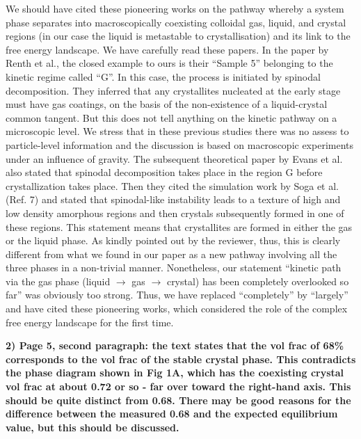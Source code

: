 \documentclass[11pt,a4paper]{article}
\newenvironment{referee}%
{\bigskip\singlespacing\bf}%
{\par\bigskip}
\begin{document}
We should have cited these pioneering works on the pathway whereby a system phase separates into macroscopically coexisting colloidal gas, liquid, and crystal regions (in our case the liquid is metastable to crystallisation) and its link to the free energy landscape. We have carefully read these papers. In the paper by Renth et al., the closed example to ours is their ``Sample 5'' belonging to the kinetic regime called ``G''. In this case, the process is initiated by spinodal decomposition. They inferred that any crystallites nucleated at the early stage must have gas coatings, on the basis of the non-existence of a liquid-crystal common tangent. But this does not tell anything on the kinetic pathway on a microscopic level. We stress that in these previous studies there was no assess to particle-level information and the discussion is based on macroscopic experiments under an influence of gravity. The subsequent theoretical paper by Evans et al. also stated that spinodal decomposition takes 
place in the region G before crystallization takes place. Then they cited the 
simulation work by Soga et al. (Ref. 7) and stated that spinodal-like instability leads to a texture of high and low density amorphous regions and then crystals subsequently formed in one of these regions. This statement means that crystallites are formed in either the gas or the liquid phase. As kindly pointed out by the reviewer, thus, this is clearly different from what we found in our paper as a new pathway involving all the three phases in a non-trivial manner. 
Nonetheless, our statement ``kinetic path via the gas phase (liquid $\rightarrow$ gas $\rightarrow$ crystal) has been completely overlooked so far'' was obviously too strong. Thus, we have replaced ``completely'' by ``largely'' and have cited these pioneering works, which considered the role of the complex free energy landscape for the first time. 



\begin{referee}
2) Page 5, second paragraph: the text states that the vol frac of 68\% corresponds to the vol frac of the stable crystal phase. This contradicts the phase diagram shown in Fig 1A, which has the coexisting crystal vol frac at about 0.72 or so - far over toward the right-hand axis. This should be quite distinct from 0.68. There may be good reasons for the difference between the measured 0.68 and the expected equilibrium value, but this should be discussed. 
\end{referee}
\end{document}
